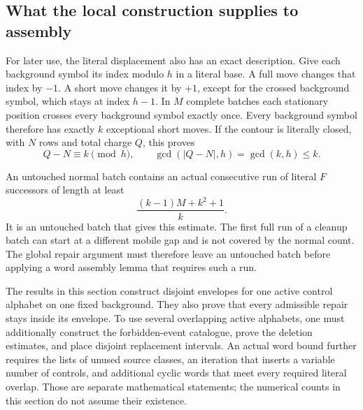 \subsection{What the local construction supplies to assembly}

For later use, the literal displacement also has an exact description.
Give each background symbol its index modulo $h$ in a literal base. A
full move changes that index by $-1$. A short move changes it by $+1$,
except for the crossed background symbol, which stays at index $h-1$.
In $M$ complete batches each stationary position crosses every background
symbol exactly once. Every background symbol therefore has exactly $k$
exceptional short moves. If the contour is literally closed, with $N$
rows and total charge $Q$, this proves
\begin{equation}
 Q-N\equiv k\pmod h,
 \qquad \gcd(|Q-N|,h)=\gcd(k,h)\leq k.
 \label{geo:displacement}
\end{equation}

An untouched normal batch contains an actual consecutive run of literal
$F$ successors of length at least
\[
 \frac{(k-1)M+k^2+1}{k}.
\]
It is an untouched batch that gives this estimate. The first full run of
a cleanup batch can start at a different mobile gap and is not covered
by the normal count. The global repair argument must therefore leave an
untouched batch before applying a word assembly lemma that requires such
a run.

The results in this section construct disjoint envelopes for one active
control alphabet on one fixed background. They also prove that every
admissible repair stays inside its envelope. To use several overlapping
active alphabets, one must additionally construct the forbidden-event
catalogue, prove the deletion estimates, and place disjoint replacement
intervals. An actual word bound further requires the lists of unused
source classes, an iteration that inserts a variable number of controls,
and additional cyclic words that meet every required literal overlap.
Those are separate mathematical statements; the numerical counts in this
section do not assume their existence.
